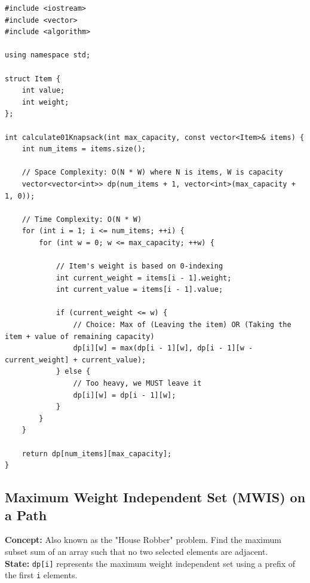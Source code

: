\begin{lstlisting}
#include <iostream>
#include <vector>
#include <algorithm>

using namespace std;

struct Item {
    int value;
    int weight;
};

int calculate01Knapsack(int max_capacity, const vector<Item>& items) {
    int num_items = items.size();
    
    // Space Complexity: O(N * W) where N is items, W is capacity
    vector<vector<int>> dp(num_items + 1, vector<int>(max_capacity + 1, 0));
    
    // Time Complexity: O(N * W)
    for (int i = 1; i <= num_items; ++i) {
        for (int w = 0; w <= max_capacity; ++w) {
            
            // Item's weight is based on 0-indexing
            int current_weight = items[i - 1].weight;
            int current_value = items[i - 1].value;
            
            if (current_weight <= w) {
                // Choice: Max of (Leaving the item) OR (Taking the item + value of remaining capacity)
                dp[i][w] = max(dp[i - 1][w], dp[i - 1][w - current_weight] + current_value);
            } else {
                // Too heavy, we MUST leave it
                dp[i][w] = dp[i - 1][w];
            }
        }
    }
    
    return dp[num_items][max_capacity];
}
\end{lstlisting}

\subsection{Maximum Weight Independent Set (MWIS) on a Path}
\textbf{Concept:} Also known as the "House Robber" problem. Find the maximum subset sum of an array such that no two selected elements are adjacent. \\
\textbf{State:} \texttt{dp[i]} represents the maximum weight independent set using a prefix of the first \texttt{i} elements.

